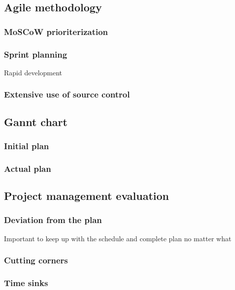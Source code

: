 	\subsection{Agile methodology}
	
		\subsubsection{MoSCoW prioriterization}
		
		\subsubsection{Sprint planning}
		Rapid development
		
		\subsubsection{Extensive use of source control}
		
	\subsection{Gannt chart}
	
		\subsubsection{Initial plan}
		
		\subsubsection{Actual plan}	
		
	\subsection{Project management evaluation}
		
		\subsubsection{Deviation from the plan}
		Important to keep up with the schedule and complete plan no matter what
		
		\subsubsection{Cutting corners}
		
		\subsubsection{Time sinks}
		
